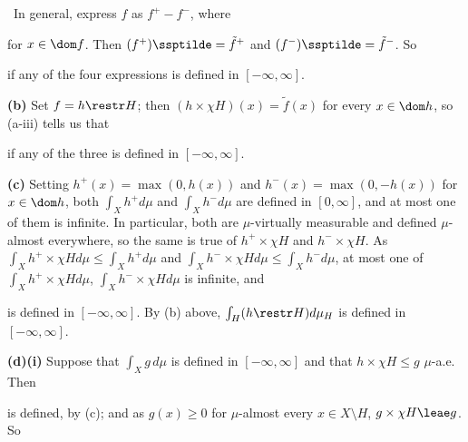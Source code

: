 {\medskip

\qquad\grheadb\ In general, express $f$ as $f^+-f^-$, where


\noindent for $x\in\dom f$.   Then $(f^+)\ssptilde=\tilde f^+$ and
$(f^-)\ssptilde=\tilde f^-$.   So


\noindent if any of the four expressions is defined in $[-\infty,\infty]$.

\medskip

{\bf (b)} Set $f=h\restr H$;  then $(h\times\chi H)(x)=\tilde f(x)$ for
every $x\in\dom h$, so (a-iii) tells us that


\noindent if any of the three is defined in $[-\infty,\infty]$.

\medskip

{\bf (c)} Setting $h^+(x)=\max(0,h(x))$ and $h^-(x)=\max(0,-h(x))$ for
$x\in\dom h$, both $\int_Xh^+d\mu$ and $\int_Xh^-d\mu$ are defined in
$[0,\infty]$, and at most one of them is infinite.   In particular, both
are $\mu$-virtually measurable and defined $\mu$-almost everywhere,
so the same is true of $h^+\times\chi H$ and $h^-\times\chi H$.    As
$\int_Xh^+\times\chi Hd\mu\le\int_Xh^+d\mu$ and
$\int_Xh^-\times\chi Hd\mu\le\int_Xh^-d\mu$, at most one of
$\int_Xh^+\times\chi Hd\mu$, $\int_Xh^-\times\chi Hd\mu$ is infinite, and


\noindent is defined in $[-\infty,\infty]$.   By (b) above,
$\int_H(h\restr H)d\mu_H$ is defined in $[-\infty,\infty]$.

\medskip

{\bf (d)(i)} Suppose that $\int_Xg\,d\mu$ is defined in $[-\infty,\infty]$
and that $h\times\chi H\le g\,\,\mu$-a.e.   Then


\noindent is defined, by (c);  and as $g(x)\ge 0$ for $\mu$-almost every
$x\in X\setminus H$, $g\times\chi H\leae g$.   So


}
